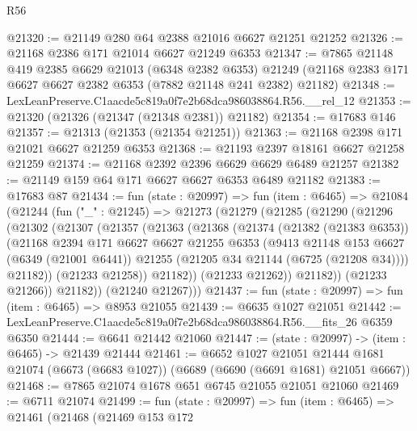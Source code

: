 \begin{lexlean}{R56}
\begin{coremodule}
@21320 := @21149 @280 @64 @2388 @21016 @6627 @21251 @21252
@21326 := @21168 @2386 @171 @21014 @6627 @21249 @6353
@21347 := @7865
    @21148
    @419
    @2385
    @6629
    @21013
    (@6348 @2382 @6353)
    @21249
    (@21168 @2383 @171 @6627 @6627 @2382 @6353 (@7882 @21148 @241 @2382) @21182)
@21348 := LexLeanPreserve.C1aacde5c819a0f7e2b68dca986038864.R56.__rel_12
@21353 := @21320 (@21326 (@21347 (@21348 @2381)) @21182)
@21354 := @17683 @146
@21357 := @21313 (@21353 (@21354 @21251))
@21363 := @21168 @2398 @171 @21021 @6627 @21259 @6353
@21368 := @21193 @2397 @18161 @6627 @21258 @21259
@21374 := @21168 @2392 @2396 @6629 @6629 @6489 @21257
@21382 := @21149 @159 @64 @171 @6627 @6627 @6353 @6489 @21182
@21383 := @17683 @87
@21434 := fun (state : @20997) =>
  fun (item : @6465) =>
  @21084
    (@21244
      (fun ("_" : @21245) =>
      @21273
        (@21279
          (@21285
            (@21290
              (@21296
                (@21302
                  (@21307
                    (@21357
                      (@21363
                        (@21368
                          (@21374
                            (@21382 (@21383 @6353))
                            (@21168
                              @2394
                              @171
                              @6627
                              @6627
                              @21255
                              @6353
                              (@9413
                                @21148
                                @153
                                @6627
                                (@6349 (@21001 @6441))
                                @21255
                                (@21205 @34 @21144 (@6725 (@21208 @34))))
                              @21182))
                          (@21233 @21258))
                        @21182))
                    (@21233 @21262))
                  @21182))
              (@21233 @21266))
            @21182))
        (@21240 @21267)))
@21437 := fun (state : @20997) => fun (item : @6465) => @8953 @21055
@21439 := @6635 @1027 @21051
@21442 := LexLeanPreserve.C1aacde5c819a0f7e2b68dca986038864.R56.__fits_26 @6359 @6350
@21444 := @6641 @21442 @21060
@21447 := (state : @20997) -> (item : @6465) -> @21439 @21444
@21461 := @6652
    @1027
    @21051
    @21444
    @1681
    @21074
    (@6673 (@6683 @1027))
    (@6689 (@6690 (@6691 @1681) @21051 @6667))
@21468 := @7865 @21074 @1678 @651 @6745 @21055 @21051 @21060
@21469 := @6711 @21074
@21499 := fun (state : @20997) =>
  fun (item : @6465) =>
  @21461
    (@21468
      (@21469
        @153
        @172

\end{coremodule}
\end{lexlean}
